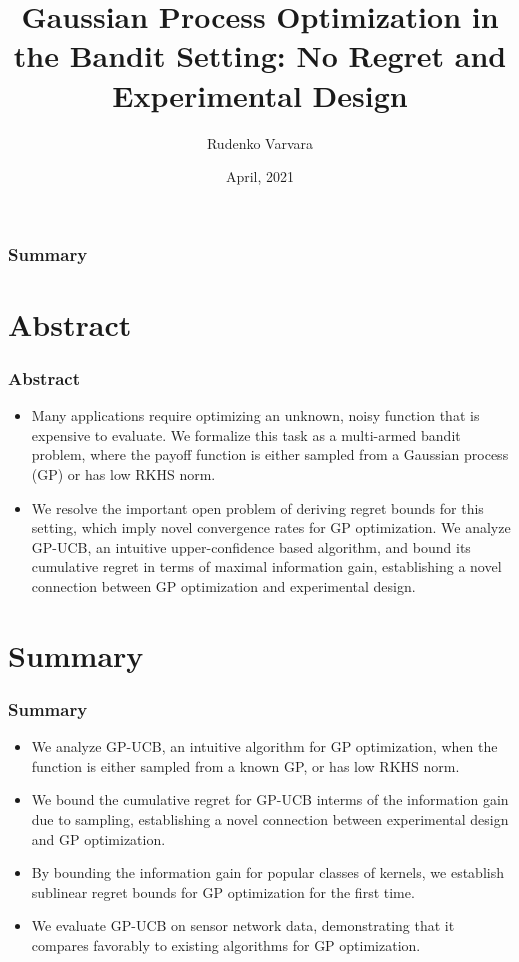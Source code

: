 \documentclass[10pt]{beamer}
\title[Title]{Gaussian Process Optimization in the Bandit Setting: No Regret and Experimental Design}
\author{\large{Rudenko Varvara} }
\institute[MIPT]
{\footnotesize
\texttt{[image: pic/11.png]}
}
\date{April, 2021}
\begin{document}
\begin{frame}
    \titlepage
\end{frame}

\begin{frame}
    \frametitle{Summary} 
    \tableofcontents 
\end{frame}
 
 

\section{Abstract}
\begin{frame}
    \frametitle{Abstract}
    \begin{itemize}
        \item Many applications require optimizing an unknown, noisy   function that is expensive to evaluate. We formalize this task as a  multi-armed bandit problem, where the payoff function is either sampled from a Gaussian process (GP) or has low RKHS norm.  
        \item We resolve the important open problem of deriving regret bounds for this setting, which imply novel convergence rates for GP optimization.   We analyze GP-UCB, an intuitive upper-confidence based algorithm, and bound its cumulative regret in terms of maximal information gain, establishing a novel connection between GP optimization and experimental design.
    \end{itemize}
\end{frame}

\section{Summary}
\begin{frame}
\frametitle{Summary}
\begin{itemize}
    \item We  analyze GP-UCB, an  intuitive  algorithm  for GP optimization, when the function is either sampled from a known GP, or has low RKHS norm.
    \item We bound  the cumulative regret for GP-UCB interms of  the  information gain due to sampling, establishing a novel connection  between experimental design and GP optimization.
    \item By bounding the information gain for popular classes of kernels,  we establish sublinear regret bounds for GP optimization for the first  time.
    \item We  evaluate GP-UCB on  sensor  network data, demonstrating that it compares favorably to existing algorithms for GP optimization.
\end{itemize}
\end{frame}
\end{document}

